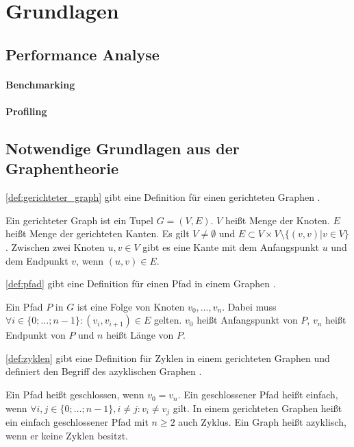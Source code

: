 \chapter{Grundlagen}

\section{Performance Analyse}
\label{sec:performance_analyse}

\subsubsection*{Benchmarking}


\subsubsection*{Profiling}


\section{Notwendige Grundlagen aus der Graphentheorie}
\label{sec:grundlagen_graphentheorie}

\autoref{def:gerichteter_graph} gibt eine Definition für einen gerichteten
Graphen \autocite[vgl.][220]{AlgorithmenUndDatenstrukturen}.
\begin{definition}
    Ein gerichteter Graph ist ein Tupel $G=(V,E)$. $V$ heißt Menge der Knoten.
    $E$ heißt Menge der gerichteten Kanten. Es gilt $V\ne\emptyset$ und $E \subset V \times
    V \setminus \{(v,v) | v \in V\}$. Zwischen zwei Knoten $u,v \in V$ gibt es
    eine Kante mit dem Anfangspunkt $u$ und dem Endpunkt $v$, wenn $(u,v) \in E$.
    \label{def:gerichteter_graph}
\end{definition}

\autoref{def:pfad} gibt eine Definition für einen Pfad in einem Graphen
\autocite[vgl.][221f]{AlgorithmenUndDatenstrukturen}.
\begin{definition}
    Ein Pfad $P$ in $G$  ist eine Folge von Knoten $v_0, \dots ,v_n$. Dabei
    muss $\forall i \in \{0; \dots; n-1 \} : (v_i,v_{i+1}) \in E$ gelten. $v_0$
    heißt Anfangspunkt von $P$, $v_n$ heißt Endpunkt von $P$ und $n$ heißt
    Länge von $P$.
    \label{def:pfad}
\end{definition}

\autoref{def:zyklen} gibt  eine Definition für Zyklen in einem gerichteten
Graphen und definiert den Begriff des azyklischen Graphen
\autocite[vgl.][222]{AlgorithmenUndDatenstrukturen}.
\begin{definition}
    Ein Pfad heißt geschlossen, wenn $v_0 = v_n$. Ein
    geschlossener Pfad heißt einfach, wenn $\forall i,j \in \{0; \dots; n-1\}, i
    \ne j:v_i \ne v_j$ gilt. In einem gerichteten Graphen heißt ein einfach
    geschlossener Pfad mit $n\geq 2$ auch Zyklus. Ein Graph heißt azyklisch,
    wenn er keine Zyklen besitzt.
    \label{def:zyklen}
\end{definition}

